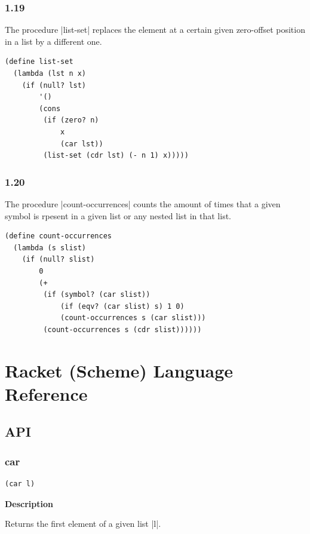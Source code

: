 \documentclass[a4paper]{article}
\begin{document}
\subsubsection*{1.19}

The procedure |list-set| replaces the element at a certain given zero-offset position in a list by a different one.

\begin{lstlisting}
(define list-set
  (lambda (lst n x)
    (if (null? lst)
        '()
        (cons
         (if (zero? n)
             x
             (car lst))
         (list-set (cdr lst) (- n 1) x)))))
\end{lstlisting}

\subsubsection*{1.20}

The procedure |count-occurrences| counts the amount of times that a given symbol is rpesent in a given list or any nested list in that list.

\begin{lstlisting}
(define count-occurrences
  (lambda (s slist)
    (if (null? slist)
        0
        (+
         (if (symbol? (car slist))
             (if (eqv? (car slist) s) 1 0)
             (count-occurrences s (car slist)))
         (count-occurrences s (cdr slist))))))
\end{lstlisting}

\newpage

\section{Racket (Scheme) Language Reference}

\subsection{API}

\subsubsection{car}

\begin{lstlisting}[frame=none]
(car l)
\end{lstlisting}

\textbf{Description}

Returns the first element of a given list |l|.
\end{document}

